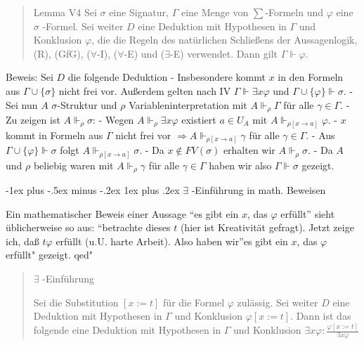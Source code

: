\documentclass[a4paper]{article}
\makeatletter
\renewcommand{\subsubsection}{\@startsection{subsubsection}{3}{0mm}%
                {-1ex plus -.5ex minus -.2ex}%
                {1ex plus .2ex}%
                {\normalfont\small\bfseries}}
\makeatother
\begin{document}
\begin{multicols}{3}
  \begin{quote}
    Lemma V4 Sei $\sigma$ eine Signatur, $\Gamma$ eine Menge von
    $\sum$-Formeln und $\varphi$ eine $\sigma$ -Formel. Sei weiter $D$ eine
    Deduktion mit Hypothesen in $\Gamma$ und Konklusion $\varphi$, die die
    Regeln des natürlichen Schließens der Aussagenlogik, (R), (GfG),
    ($\forall$-I), ($\forall$-E) und ($\exists$-E) verwendet. Dann gilt
    $\Gamma\Vdash\varphi$.
  \end{quote}

  Beweis: Sei $D$ die folgende Deduktion - Insbesondere kommt $x$ in den
  Formeln aus $\Gamma\cup\{\sigma\}$ nicht frei vor. Außerdem gelten nach
  IV $\Gamma\Vdash\exists x\varphi$ und
  $\Gamma\cup\{\varphi\}\Vdash\sigma$. - Sei nun $A$ $\sigma$-Struktur und
  $\rho$ Variableninterpretation mit $A\Vdash_\rho\Gamma$ für alle
  $\gamma\in\Gamma$. - Zu zeigen ist $A\Vdash_\rho\sigma$: - Wegen
  $A\Vdash_\rho\exists x\varphi$ existiert $a\in U_A$ mit
  $A\Vdash_{\rho[x\rightarrow a]}\varphi$. - $x$ kommt in Formeln aus
  $\Gamma$ nicht frei vor
  $\Rightarrow A\Vdash_{\rho[x\rightarrow a]}\gamma$ für alle
  $\gamma\in\Gamma$. - Aus $\Gamma\cup\{\varphi\}\Vdash\sigma$ folgt
  $A\Vdash_{\rho[x\rightarrow a]}\sigma$. - Da $x\not\in FV(\sigma)$
  erhalten wir $A\Vdash_\rho \sigma$. - Da $A$ und $\rho$ beliebig waren
  mit $A\Vdash_\rho\gamma$ für alle $\gamma\in\Gamma$ haben wir also
  $\Gamma\Vdash\sigma$ gezeigt.

  \subsubsection{$\exists$ -Einführung in math.
    Beweisen}\label{exists--einfuxfchrung-in-math.-beweisen}

  Ein mathematischer Beweis einer Aussage ``es gibt ein $x$, das $\varphi$
  erfüllt'' sieht üblicherweise so aus: ``betrachte dieses $t$ (hier ist
  Kreativität gefragt). Jetzt zeige ich, daß $t\varphi$ erfüllt (u.U.
  harte Arbeit). Also haben wir''es gibt ein $x$, das $\varphi$ erfüllt"
  gezeigt. qed"

  \begin{quote}
    $\exists$ -Einführung

    Sei die Substitution $[x:=t]$ für die Formel $\varphi$ zulässig. Sei
    weiter $D$ eine Deduktion mit Hypothesen in $\Gamma$ und Konklusion
    $\varphi[x:=t]$. Dann ist das folgende eine Deduktion mit Hypothesen in
    $\Gamma$ und Konklusion
    $\exists x\varphi:\frac{\varphi[x:=t]}{\exists x\varphi}$


\end{quote}
\end{multicols}
\end{document}
